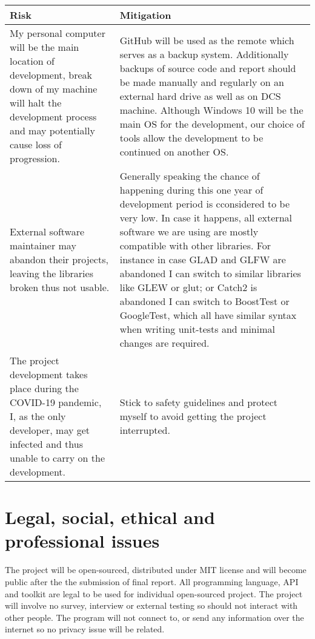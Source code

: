 \documentclass[oneside, a4paper]{article}
\begin{document}
    \begin{center}
        \begin{tabular}{ | p{7.5cm} || p{7.5cm} | }
            \hline
            Risk & Mitigation \\
            \hline
            \hline
            My personal computer will be the main location of development, break down of my machine will halt the development process and may potentially cause loss of progression. & 
            GitHub will be used as the remote which serves as a backup system. Additionally backups of source code and report should be made manually and regularly on an external hard drive as well as on DCS machine. Although Windows 10 will be the main OS for the development, our choice of tools allow the development to be continued on another OS. \\
            \hline
            External software maintainer may abandon their projects, leaving the libraries broken thus not usable. &
            Generally speaking the chance of happening during this one year of development period is cconsidered to be very low. In case it happens, all external software we are using are mostly compatible with other libraries. For instance in case GLAD and GLFW are abandoned I can switch to similar libraries like GLEW or glut; or Catch2 is abandoned I can switch to BoostTest or GoogleTest, which all have similar syntax when writing unit-tests and minimal changes are required. \\
            \hline
            The project development takes place during the COVID-19 pandemic, I, as the only developer, may get infected and thus unable to carry on the development. &
            Stick to safety guidelines and protect myself to avoid getting the project interrupted. \\
            \hline
        \end{tabular}
    \end{center}

    \section{Legal, social, ethical and professional issues}
    The project will be open-sourced, distributed under MIT license and will become public after the the submission of final report. All programming language, API and toolkit are legal to be used for individual open-sourced project. The project will involve no survey, interview or external testing so should not interact with other people. The program will not connect to, or send any information over the internet so no privacy issue will be related.
\end{document}

